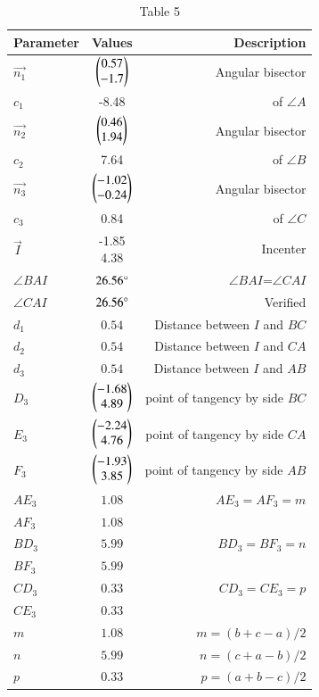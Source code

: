 \documentclass[journal,12pt,twocolumn]{IEEEtran}
\theoremstyle{remark}
\begin{document}
\begin{table}[h!]
 \begin{center}
  \caption{Table 5}
  \label{tab: table5}
\begin{tabular}{|l|c|r|}
     \hline
    Parameter & Values & Description\\
     \hline
     $\vec{n_1}$ & $\begin{pmatrix}0.57\\-1.7\\\end{pmatrix}$ & Angular bisector\\
     ${c_1}$ & -8.48 & of $\angle A$\\
     $\vec{n_2}$ & $\begin{pmatrix}0.46\\1.94\\\end{pmatrix}$ & Angular bisector\\
     ${c_2}$ & 7.64 & of $\angle B$\\
     $\vec{n_3}$ & $\begin{pmatrix}-1.02\\-0.24\\\end{pmatrix}$ & Angular bisector\\
     ${c_3}$ & 0.84 & of $\angle C$\\
     \hline
     $\vec I$ & \myvec{-1.85\\4.38\\} & Incenter\\
     \hline
     $\angle BAI$ &  $26.56\degree$ & $\angle BAI$=$\angle CAI$\\
     $\angle CAI$ & $26.56\degree$ & Verified\\
     \hline
     ${d_1}$ & $0.54$ & Distance between $I$ and $BC$\\
     ${d_2}$ & $0.54$ & Distance between $I$ and $CA$\\
     ${d_3}$ & $0.54$ & Distance between $I$ and $AB$\\
     \hline
     $D_3$ & $\begin{pmatrix}-1.68\\4.89\\\end{pmatrix}$ & point of tangency by side $BC$\\
     $E_3$ & $\begin{pmatrix}-2.24\\4.76\\\end{pmatrix}$ & point of tangency by side $CA$\\
     $F_3$ & $\begin{pmatrix}-1.93\\3.85\\\end{pmatrix}$ & point of tangency by side $AB$\\
     \hline
     $AE_3$ & $1.08$ & $AE_3=AF_3=m$\\
     $AF_3$ & $1.08$ & {}\\
     $BD_3$ & $5.99$ & $BD_3=BF_3=n$\\
     $BF_3$ & $5.99$ & {}\\
     $CD_3$ & $0.33$ & $CD_3=CE_3=p$\\
     $CE_3$ & $0.33$ & {}\\
     \hline
     $m$ & $1.08$ & $m=(b+c-a)/2$\\
     $n$ & $5.99$ & $n=(c+a-b)/2$\\
     $p$ & $0.33$ & $p=(a+b-c)/2$\\
     \hline
\end{tabular}
\end{center}
\end{table}
\end{document}
